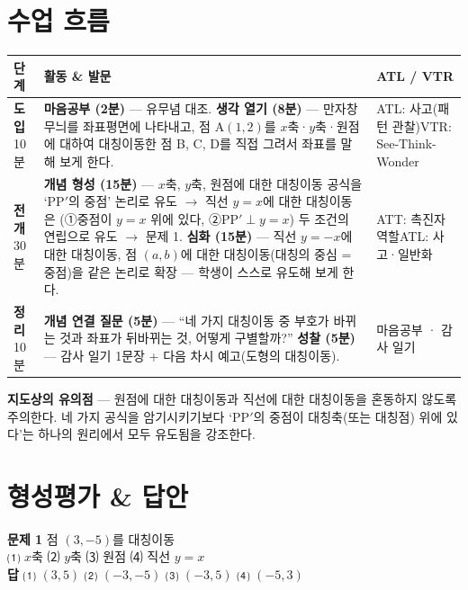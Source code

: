 \documentclass[11pt,a4paper]{article}
\begin{document}
\section{수업 흐름}
\begin{tabularx}{\linewidth}{@{}>{\centering\arraybackslash}p{1.6cm}X>{\raggedright\arraybackslash\small}p{3.1cm}@{}}
\toprule
\textbf{단계} & \textbf{활동 \& 발문} & \textbf{ATL / VTR} \\
\midrule
\textcolor{goldstrong}{\textbf{도입}}\newline\footnotesize 10분 &
\textbf{마음공부 (2분)} --- 유무념 대조.\newline
\textbf{생각 열기 (8분)} --- 만자창 무늬를 좌표평면에 나타내고, 점 A$(1,2)$를 $x$축·$y$축·원점에 대하여 대칭이동한 점 B, C, D를 직접 그려서 좌표를 말해 보게 한다. &
ATL: 사고(패턴 관찰)\newline VTR: See-Think-Wonder \\
\addlinespace
\textcolor{goldstrong}{\textbf{전개}}\newline\footnotesize 30분 &
\textbf{개념 형성 (15분)} --- $x$축, $y$축, 원점에 대한 대칭이동 공식을 `PP$'$의 중점' 논리로 유도 $\to$ 직선 $y=x$에 대한 대칭이동은 (①중점이 $y=x$ 위에 있다, ②PP$'\perp y=x$) 두 조건의 연립으로 유도 $\to$ 문제 1.\newline
\textbf{심화 (15분)} --- 직선 $y=-x$에 대한 대칭이동, 점 $(a,b)$에 대한 대칭이동(대칭의 중심 = 중점)을 같은 논리로 확장 --- 학생이 스스로 유도해 보게 한다. &
ATT: 촉진자 역할\newline ATL: 사고·일반화 \\
\addlinespace
\textcolor{goldstrong}{\textbf{정리}}\newline\footnotesize 10분 &
\textbf{개념 연결 질문 (5분)} --- ``네 가지 대칭이동 중 부호가 바뀌는 것과 좌표가 뒤바뀌는 것, 어떻게 구별할까?''\newline
\textbf{성찰 (5분)} --- 감사 일기 1문장 + 다음 차시 예고(도형의 대칭이동). &
마음공부 · 감사 일기 \\
\bottomrule
\end{tabularx}

\begin{calloutbox}
\textbf{지도상의 유의점} --- 원점에 대한 대칭이동과 직선에 대한 대칭이동을 혼동하지 않도록 주의한다. 네 가지 공식을 암기시키기보다 `PP$'$의 중점이 대칭축(또는 대칭점) 위에 있다'는 하나의 원리에서 모두 유도됨을 강조한다.
\end{calloutbox}

\section{형성평가 \& 답안}
\begin{answerbox}
\textbf{문제 1} \quad 점 $(3,-5)$를 대칭이동\\
\small ⑴ $x$축 \quad ⑵ $y$축 \quad ⑶ 원점 \quad ⑷ 직선 $y=x$\\[4pt]
\textbf{\color{goldstrong}답} \; ⑴ $(3,5)$ \quad ⑵ $(-3,-5)$ \quad ⑶ $(-3,5)$ \quad ⑷ $(-5,3)$
\end{answerbox}
\end{document}
